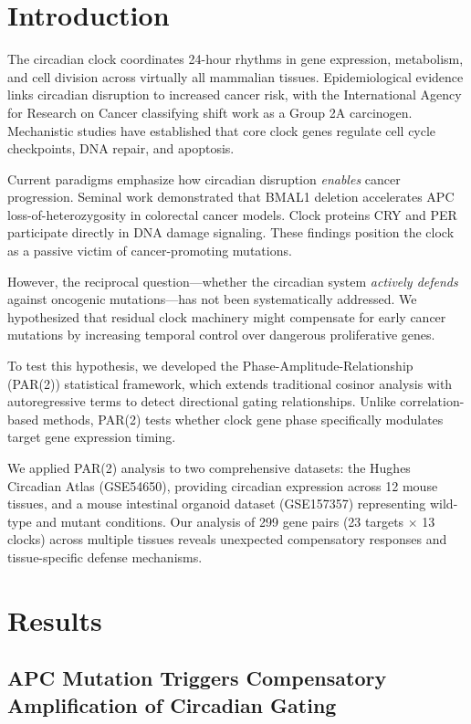 \documentclass[11pt,letterpaper]{article}
\begin{document}
\section{Introduction}

The circadian clock coordinates 24-hour rhythms in gene expression, metabolism, and cell division across virtually all mammalian tissues. Epidemiological evidence links circadian disruption to increased cancer risk, with the International Agency for Research on Cancer classifying shift work as a Group 2A carcinogen. Mechanistic studies have established that core clock genes regulate cell cycle checkpoints, DNA repair, and apoptosis.

Current paradigms emphasize how circadian disruption \textit{enables} cancer progression. Seminal work demonstrated that BMAL1 deletion accelerates APC loss-of-heterozygosity in colorectal cancer models. Clock proteins CRY and PER participate directly in DNA damage signaling. These findings position the clock as a passive victim of cancer-promoting mutations.

However, the reciprocal question---whether the circadian system \textit{actively defends} against oncogenic mutations---has not been systematically addressed. We hypothesized that residual clock machinery might compensate for early cancer mutations by increasing temporal control over dangerous proliferative genes.

To test this hypothesis, we developed the Phase-Amplitude-Relationship (PAR(2)) statistical framework, which extends traditional cosinor analysis with autoregressive terms to detect directional gating relationships. Unlike correlation-based methods, PAR(2) tests whether clock gene phase specifically modulates target gene expression timing.

We applied PAR(2) analysis to two comprehensive datasets: the Hughes Circadian Atlas (GSE54650), providing circadian expression across 12 mouse tissues, and a mouse intestinal organoid dataset (GSE157357) representing wild-type and mutant conditions. Our analysis of 299 gene pairs (23 targets $\times$ 13 clocks) across multiple tissues reveals unexpected compensatory responses and tissue-specific defense mechanisms.

\section{Results}

\subsection{APC Mutation Triggers Compensatory Amplification of Circadian Gating}
\end{document}
